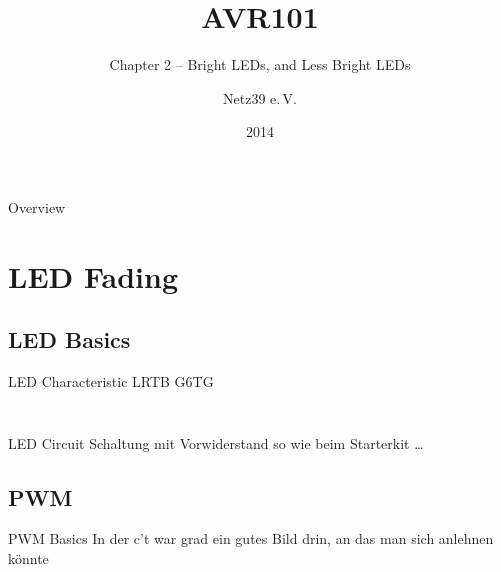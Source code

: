 \documentclass{beamer}
\title{AVR101}
\subtitle{Chapter 2 -- Bright LEDs, and Less Bright LEDs}
\author{Netz39 e.\,V.}
\institute{\url{http://www.netz39.de/}}
\date{2014}
\begin{document}
\begin{frame}
	\titlepage
\end{frame}

\begin{frame}{Overview}
    \tableofcontents
\end{frame}

\section{LED Fading}

\subsection{LED Basics}

\begin{frame}{LED Characteristic LRTB G6TG}
    \begin{columns}                                                        
        \begin{column}{0.5\textwidth}
            \begin{figure}
            \end{figure}
        \end{column}                                                       
        \begin{column}{0.5\textwidth}
            \begin{figure}                                                 
            \end{figure}                                                   
        \end{column}                                                       
    \end{columns}                      
\end{frame}

\begin{frame}{LED Circuit}
    Schaltung mit Vorwiderstand so wie beim Starterkit …
\end{frame}

\subsection{PWM}

\begin{frame}{PWM Basics}
    In der c't war grad ein gutes Bild drin, an das man sich anlehnen könnte
\end{frame}
\end{document}
